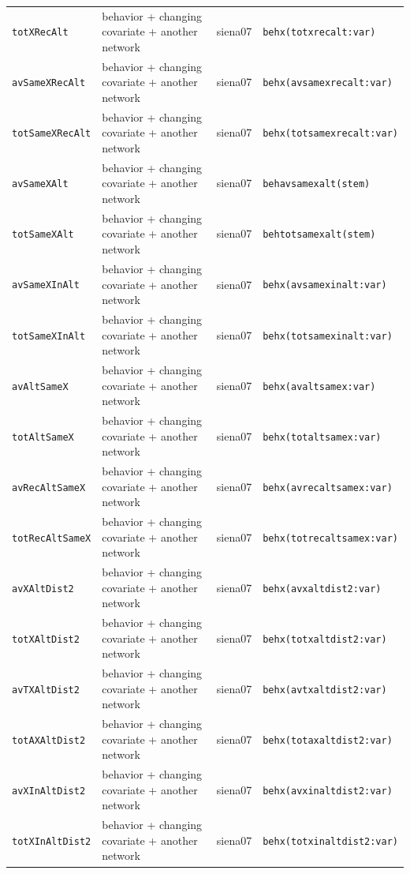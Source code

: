 \begin{longtable}{@{}p{2.6cm}p{3.2cm}p{2.9cm}p{5.4cm}@{}}
\texttt{totXRecAlt} & behavior + changing covariate + another network & siena07 & \texttt{behx(totxrecalt:var)}\\
\texttt{avSameXRecAlt} & behavior + changing covariate + another network & siena07 & \texttt{behx(avsamexrecalt:var)}\\
\texttt{totSameXRecAlt} & behavior + changing covariate + another network & siena07 & \texttt{behx(totsamexrecalt:var)}\\
\texttt{avSameXAlt} & behavior + changing covariate + another network & siena07 & \texttt{behavsamexalt(stem)}\\
\texttt{totSameXAlt} & behavior + changing covariate + another network & siena07 & \texttt{behtotsamexalt(stem)}\\
\texttt{avSameXInAlt} & behavior + changing covariate + another network & siena07 & \texttt{behx(avsamexinalt:var)}\\
\texttt{totSameXInAlt} & behavior + changing covariate + another network & siena07 & \texttt{behx(totsamexinalt:var)}\\
\texttt{avAltSameX} & behavior + changing covariate + another network & siena07 & \texttt{behx(avaltsamex:var)}\\
\texttt{totAltSameX} & behavior + changing covariate + another network & siena07 & \texttt{behx(totaltsamex:var)}\\
\texttt{avRecAltSameX} & behavior + changing covariate + another network & siena07 & \texttt{behx(avrecaltsamex:var)}\\
\texttt{totRecAltSameX} & behavior + changing covariate + another network & siena07 & \texttt{behx(totrecaltsamex:var)}\\
\texttt{avXAltDist2} & behavior + changing covariate + another network & siena07 & \texttt{behx(avxaltdist2:var)}\\
\texttt{totXAltDist2} & behavior + changing covariate + another network & siena07 & \texttt{behx(totxaltdist2:var)}\\
\texttt{avTXAltDist2} & behavior + changing covariate + another network & siena07 & \texttt{behx(avtxaltdist2:var)}\\
\texttt{totAXAltDist2} & behavior + changing covariate + another network & siena07 & \texttt{behx(totaxaltdist2:var)}\\
\texttt{avXInAltDist2} & behavior + changing covariate + another network & siena07 & \texttt{behx(avxinaltdist2:var)}\\
\texttt{totXInAltDist2} & behavior + changing covariate + another network & siena07 & \texttt{behx(totxinaltdist2:var)}\\

\end{longtable}
